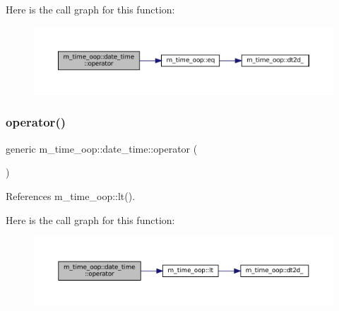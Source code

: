 Here is the call graph for this function\+:\nopagebreak
\begin{figure}[H]
\begin{center}
\leavevmode
\includegraphics[width=350pt]{structm__time__oop_1_1date__time_a33e80b5e54eec6e02c3a9dc0bc30e31a_cgraph}
\end{center}
\end{figure}
\mbox{\label{structm__time__oop_1_1date__time_a0ec512d8349ac86358a3effcaead9de6}} 
\subsubsection{\texorpdfstring{operator()}{operator()}\hspace{0.1cm}{\footnotesize\ttfamily [3/9]}}
{\footnotesize\ttfamily generic m\+\_\+time\+\_\+oop\+::date\+\_\+time\+::operator (\begin{DoxyParamCaption}{ }\end{DoxyParamCaption})\hspace{0.3cm}{\ttfamily [private]}}



References m\+\_\+time\+\_\+oop\+::lt().

Here is the call graph for this function\+:\nopagebreak
\begin{figure}[H]
\begin{center}
\leavevmode
\includegraphics[width=350pt]{structm__time__oop_1_1date__time_a0ec512d8349ac86358a3effcaead9de6_cgraph}
\end{center}
\end{figure}
\mbox{\label{structm__time__oop_1_1date__time_abcf0f17b4e6ba71f0777dc4e4e47de7f}} 
